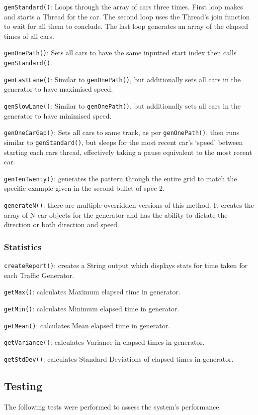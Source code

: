 \documentclass[11pt, oneside]{article}
\begin{document}
\texttt{genStandard()}: Loops through the array of cars three times. First loop makes and starts a Thread for the car. The second loop uses the Thread's join function to wait for all them to conclude. The last loop generates an array of the elapsed times of all cars.

\texttt{genOnePath()}: Sets all cars to have the same inputted start index then calls \texttt{genStandard()}.

\texttt{genFastLane()}: Similar to \texttt{genOnePath()}, but additionally sets all cars in the generator to have maximised speed.

\texttt{genSlowLane()}: Similar to \texttt{genOnePath()}, but additionally sets all cars in the generator to have minimised speed.

\texttt{genOneCarGap()}: Sets all cars to same track, as per \texttt{genOnePath()}, then runs similar to \texttt{genStandard()}, but sleeps for the most recent car's `speed' between starting each cars thread, effectively taking a pause equivalent to the most recent car.

\texttt{genTenTwenty()}: generates the pattern through the entire grid to match the specific example given in the second bullet of spec 2.

\texttt{generateN()}: there are multiple overridden versions of this method. It creates the array of N car objects for the generator and has the ability to dictate the direction or both direction and speed.

\subsubsection*{Statistics}
\texttt{createReport()}: creates a String output which displays stats for time taken for each Traffic Generator.

\texttt{getMax()}: calculates Maximum elapsed time in generator.

\texttt{getMin()}: calculates Minimum elapsed time in generator.

\texttt{getMean()}: calculates Mean elapsed time in generator.

\texttt{getVariance()}: calculates Variance in elapsed times in generator.

\texttt{getStdDev()}: calculates Standard Deviations of elapsed times in generator.

\subsection*{Testing}
The following tests were performed to assess the system's performance. 
\end{document}
